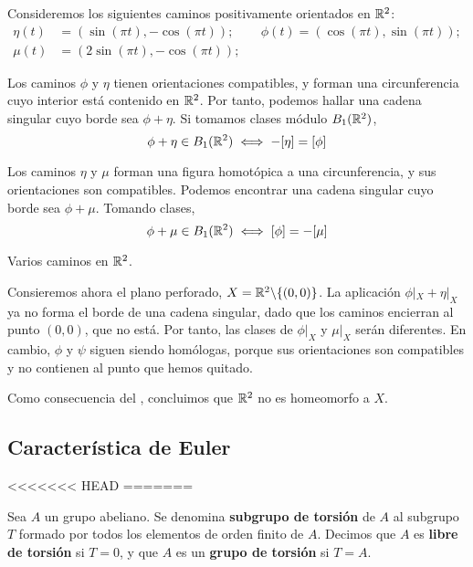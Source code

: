 \begin{proposition}
Consideremos los siguientes caminos positivamente orientados en $\mathbb{R}^2$:
\begin{align*}
	\eta(t)	&=(\sin(\pi t),-\cos(\pi t)); &&\phi(t)=(\cos(\pi t),\sin(\pi t));\\
	\mu(t)	&=(2\sin(\pi t),-\cos(\pi t));
\end{align*}

Los caminos $\phi$ y $\eta$ tienen orientaciones compatibles, y forman una circunferencia cuyo interior está contenido en $\mathbb{R}^2$.
Por tanto, podemos hallar una cadena singular cuyo borde sea $\phi+\eta$.
Si tomamos clases módulo $B_1(\mathbb{R}^2)$,
	\[\phi+\eta \in B_1(\mathbb{R}^2) \iff -[\eta]=[\phi]\]

Los caminos $\eta$ y $\mu$ forman una figura homotópica a una circunferencia, y sus orientaciones son compatibles.
Podemos encontrar una cadena singular cuyo borde sea $\phi+\mu$. Tomando clases,
	\[\phi+\mu \in B_1(\mathbb{R}^2) \iff [\phi]=-[\mu]\]

\begin{marginfigure}
	
	\caption{Varios caminos en $\mathbb{R}^2$.}
\end{marginfigure}

Consieremos ahora el plano perforado, $X=\mathbb{R}^2\backslash\{(0,0)\}$.
La aplicación $\phi|_X+\eta|_X$ ya no forma el borde de una cadena singular, dado que los caminos encierran al punto $(0,0)$, que no está.
Por tanto, las clases de $\phi|_X$ y $\mu|_X$ serán diferentes.
En cambio, $\phi$ y $\psi$ siguen siendo homólogas, porque sus orientaciones son compatibles y no contienen al punto que hemos quitado.

Como consecuencia del , concluimos que $\mathbb{R}^2$ no es homeomorfo a $X$.

\subsection{Característica de Euler}
<<<<<<< HEAD
=======
\begin{definition}
Sea $A$ un grupo abeliano. Se denomina \textbf{subgrupo de torsión} de $A$ al
subgrupo $T$ formado por todos los elementos de orden finito de $A$. Decimos que
$A$ es \textbf{libre de torsión} si $T=0$, y que $A$ es un \textbf{grupo de
torsión} si $T=A$.
\end{definition}


\end{proposition}
